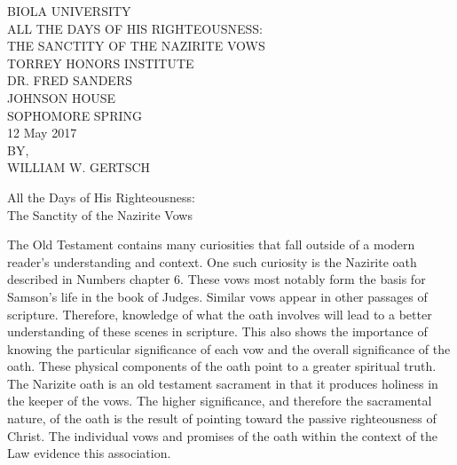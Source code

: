 \documentclass[12pt]{turabian-researchpaper}
\author{Will}
\begin{document}
\thispagestyle{empty}
 \begin{center}
 BIOLA UNIVERSITY\\
 \vspace{4cm}
 ALL THE DAYS OF HIS RIGHTEOUSNESS:\\
 \vspace{0.1cm}
 THE SANCTITY OF THE NAZIRITE VOWS\\
 \vspace{3cm}
 TORREY HONORS INSTITUTE\\
 \vspace{0.1cm}
 DR. FRED SANDERS\\
 \vspace{0.1cm}
 JOHNSON HOUSE\\
 \vspace{0.1cm}
 SOPHOMORE SPRING\\
 \vspace{2cm}
 12 May 2017\\
 \vspace{3cm}
 BY,\\
 \vspace{0.1cm}
 WILLIAM W. GERTSCH
 \end{center}
 \pagebreak
 
 \thispagestyle{plain}
 \setcounter{page}{1}
 \begin{center}
 All the Days of His Righteousness:\\
 The Sanctity of the Nazirite Vows
 \end{center}
 

The Old Testament contains many curiosities that fall outside of a modern reader's understanding and context.
One such curiosity is the Nazirite oath described in Numbers chapter 6. 
These vows most notably form the basis for Samson's life in the book of Judges. 
Similar vows appear in other passages of scripture. 
Therefore, knowledge of what the oath involves will lead to a better understanding of these scenes in scripture. 
This also shows the importance of knowing the particular significance of each vow and the overall significance of the oath. 
These physical components of the oath point to a greater spiritual truth. 
The Narizite oath is an old testament sacrament in that it produces holiness in the keeper of the vows.
The higher significance, and therefore the sacramental nature, of the oath is the result of pointing toward the passive righteousness of Christ. 
The individual vows and promises of the oath within the context of the Law evidence this association.
\end{document}
